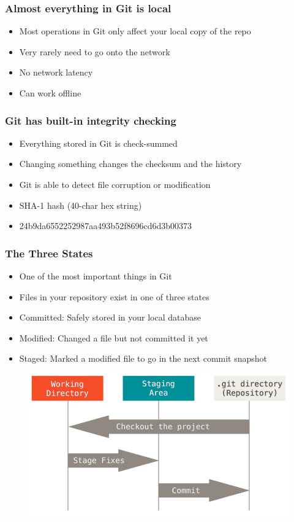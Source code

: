\documentclass{beamer}
\begin{document}
\begin{frame}
	\frametitle{Almost everything in Git is local}
	\begin{itemize}
		\item{Most operations in Git only affect your local copy of the repo}
		\item{Very rarely need to go onto the network}
		\item{No network latency}
		\item{Can work offline}
	\end{itemize}

\end{frame}

\begin{frame}
	\frametitle{Git has built-in integrity checking}
	\begin{itemize}
		\item{Everything stored in Git is check-summed}
		\item{Changing something changes the checksum and the history}
		\item{Git is able to detect file corruption or modification}
		\item{SHA-1 hash (40-char hex string)}
		\item{24b9da6552252987aa493b52f8696cd6d3b00373}
	\end{itemize}

\end{frame}

\begin{frame}
	\frametitle{The Three States}
	\begin{itemize}
		\item{One of the most important things in Git}
		\item{Files in your repository exist in one of three states}
		\item{Committed: Safely stored in your local database}
		\item{Modified: Changed a file but not committed it yet}
		\item{Staged: Marked a modified file to go in the next commit snapshot}
	\end{itemize}
	\begin{figure}
		\includegraphics[scale=0.25]{The_Three_States-0.png}
	\end{figure}

\end{frame}
\end{document}
